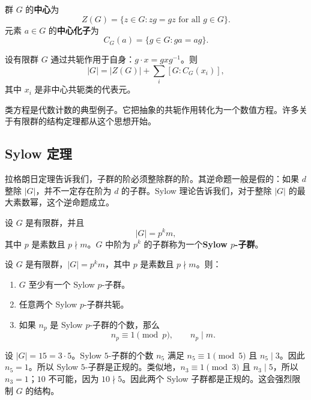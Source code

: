 \begin{definition}[中心与中心化子]
群 $G$ 的\textbf{中心}为
\[
    Z(G)=\{z\in G:zg=gz\text{ for all }g\in G\}.
\]
元素 $a\in G$ 的\textbf{中心化子}为
\[
    C_G(a)=\{g\in G:ga=ag\}.
\]
\end{definition}

\begin{theorem}[类方程]
设有限群 $G$ 通过共轭作用于自身：$g\cdot x=gxg^{-1}$。则
\[
    |G|=|Z(G)|+\sum_i [G:C_G(x_i)],
\]
其中 $x_i$ 是非中心共轭类的代表元。
\end{theorem}

\begin{remark}
类方程是代数计数的典型例子。它把抽象的共轭作用转化为一个数值方程。许多关于有限群的结构定理都从这个思想开始。
\end{remark}

\subsection{Sylow 定理}

拉格朗日定理告诉我们，子群的阶必须整除群的阶。其逆命题一般是假的：如果 $d$ 整除 $|G|$，并不一定存在阶为 $d$ 的子群。Sylow 理论告诉我们，对于整除 $|G|$ 的最大素数幂，这个逆命题成立。

\begin{definition}[Sylow $p$-子群]
设 $G$ 是有限群，并且
\[
    |G|=p^k m,
\]
其中 $p$ 是素数且 $p\nmid m$。$G$ 中阶为 $p^k$ 的子群称为一个\textbf{Sylow $p$-子群}。
\end{definition}

\begin{theorem}[Sylow 定理]
设 $G$ 是有限群，$|G|=p^k m$，其中 $p$ 是素数且 $p\nmid m$。则：
\begin{enumerate}
    \item $G$ 至少有一个 Sylow $p$-子群。
    \item 任意两个 Sylow $p$-子群共轭。
    \item 如果 $n_p$ 是 Sylow $p$-子群的个数，那么
    \[
        n_p\equiv 1\pmod p,
        \qquad
        n_p\mid m.
    \]
\end{enumerate}
\end{theorem}


\begin{example}[一个 $15$ 阶群]
设 $|G|=15=3\cdot 5$。Sylow $5$-子群的个数 $n_5$ 满足 $n_5\equiv 1\pmod 5$ 且 $n_5\mid 3$。因此 $n_5=1$。所以 Sylow $5$-子群是正规的。类似地，$n_3\equiv 1\pmod 3$ 且 $n_3\mid 5$，所以 $n_3=1$；$10$ 不可能，因为 $10\nmid 5$。因此两个 Sylow 子群都是正规的。这会强烈限制 $G$ 的结构。
\end{example}

